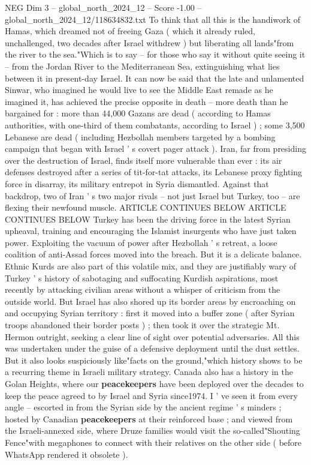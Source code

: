 \begin{textsample}{NEG Dim 3 – global\_north\_2024\_12 – Score -1.00 – global\_north\_2024\_12/118634832.txt}
To think that all this is the handiwork of Hamas, which dreamed not of freeing Gaza ( which it already ruled, unchallenged, two decades after Israel withdrew ) but liberating all lands"from the river to the sea."Which is to say -- for those who say it without quite seeing it -- from the Jordan River to the Mediterranean Sea, extinguishing what lies between it in present-day Israel.
It can now be said that the late and unlamented Sinwar, who imagined he would live to see the Middle East remade as he imagined it, has achieved the precise opposite in death -- more death than he bargained for : more than 44,000 Gazans are dead ( according to Hamas authorities, with one-third of them combatants, according to Israel ) ; some 3,500 Lebanese are dead ( including Hezbollah members targeted by a bombing campaign that began with Israel ' s covert pager attack ).
Iran, far from presiding over the destruction of Israel, finds itself more vulnerable than ever : its air defenses destroyed after a series of tit-for-tat attacks, its Lebanese proxy fighting force in disarray, its military entrepot in Syria dismantled.
Against that backdrop, two of Iran ' s two major rivals -- not just Israel but Turkey, too -- are flexing their newfound muscle.
ARTICLE CONTINUES BELOW ARTICLE CONTINUES BELOW Turkey has been the driving force in the latest Syrian upheaval, training and encouraging the Islamist insurgents who have just taken power.
Exploiting the vacuum of power after Hezbollah ' s retreat, a loose coalition of anti-Assad forces moved into the breach.
But it is a delicate balance.
Ethnic Kurds are also part of this volatile mix, and they are justifiably wary of Turkey ' s history of sabotaging and suffocating Kurdish aspirations, most recently by attacking civilian areas without a whisper of criticism from the outside world.
But Israel has also shored up its border areas by encroaching on and occupying Syrian territory : first it moved into a buffer zone ( after Syrian troops abandoned their border posts ) ; then took it over the strategic Mt.
Hermon outright, seeking a clear line of sight over potential adversaries.
All this was undertaken under the guise of a defensive deployment until the dust settles.
But it also looks suspiciously like"facts on the ground,"which history shows to be a recurring theme in Israeli military strategy.
Canada also has a history in the Golan Heights, where our \textbf{peacekeepers} have been deployed over the decades to keep the peace agreed to by Israel and Syria since1974.
I ' ve seen it from every angle -- escorted in from the Syrian side by the ancient regime ' s minders ; hosted by Canadian \textbf{peacekeepers} at their reinforced base ; and viewed from the Israeli-annexed side, where Druze families would visit the so-called"Shouting Fence"with megaphones to connect with their relatives on the other side ( before WhatsApp rendered it obsolete ).

\end{textsample}
